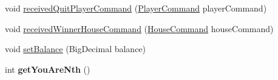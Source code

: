 \begin{DoxyCompactItemize}
\item 
void \hyperlink{classhu_1_1elte_1_1bfw1p6_1_1poker_1_1client_1_1view_1_1_abstract_main_view_af4f7d1bdbab880499d2626ed514b61ed}{received\+Quit\+Player\+Command} (\hyperlink{classhu_1_1elte_1_1bfw1p6_1_1poker_1_1command_1_1_player_command}{Player\+Command} player\+Command)
\item 
void \hyperlink{classhu_1_1elte_1_1bfw1p6_1_1poker_1_1client_1_1view_1_1_abstract_main_view_a689d03cca5fac4ce6b37ebdac73e0d9c}{received\+Winner\+House\+Command} (\hyperlink{classhu_1_1elte_1_1bfw1p6_1_1poker_1_1command_1_1_house_command}{House\+Command} house\+Command)
\item 
void \hyperlink{classhu_1_1elte_1_1bfw1p6_1_1poker_1_1client_1_1view_1_1_abstract_main_view_a73dba815bc94625a7c20f9332108d447}{set\+Balance} (Big\+Decimal balance)
\item 
\hypertarget{classhu_1_1elte_1_1bfw1p6_1_1poker_1_1client_1_1view_1_1_abstract_main_view_aa78424daa3cfe95a1c4bd4f4bdb007b8}{}int {\bfseries get\+You\+Are\+Nth} ()\label{classhu_1_1elte_1_1bfw1p6_1_1poker_1_1client_1_1view_1_1_abstract_main_view_aa78424daa3cfe95a1c4bd4f4bdb007b8}

\end{DoxyCompactItemize}
